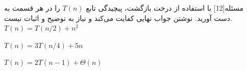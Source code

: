 ‌مسئله[12]
با استفاده از درخت بازگشت، پیچیدگی تابع $T(n)$ را در هر قسمت به دست آورید. نوشتن جواب نهایی کفایت می‌کند و نیاز به توضیح و اثبات نیست.
$T(n) = T(n/2) + n^2$

$T(n) =3T(n/4) + 5n$

$T(n) = 2T(n-1) + \Theta(n)$












